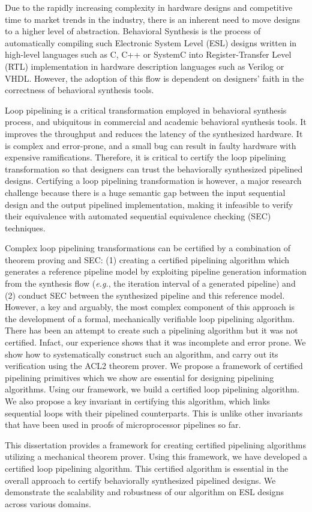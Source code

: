 Due to the rapidly increasing complexity in hardware designs and competitive time to market trends in the industry, there is an inherent need to move designs to a higher level of abstraction. Behavioral Synthesis is the process of automatically compiling such Electronic System Level (ESL) designs written in high-level languages such as C, C++ or SystemC into Register-Transfer Level (RTL) implementation in hardware description languages such as Verilog or VHDL. However, the adoption of this flow is dependent on designers' faith in the correctness of behavioral synthesis tools. 

Loop pipelining is a critical transformation employed in behavioral synthesis process, and ubiquitous in commercial and academic behavioral synthesis tools. It improves the throughput and reduces the latency of the synthesized hardware. It is complex and error-prone, and a small bug can result in faulty hardware with expensive ramifications. Therefore, it is critical to certify the loop pipelining transformation so that designers can trust the behaviorally synthesized pipelined designs.
Certifying a loop pipelining transformation is however, a major research challenge
because there is a huge semantic gap between the input sequential design and the output pipelined implementation, making it infeasible to verify their equivalence with automated sequential equivalence checking (SEC) techniques.

Complex loop pipelining transformations can be certified by a combination of theorem proving and SEC: (1) creating a certified pipelining algorithm which generates a reference pipeline model by exploiting pipeline generation information from the synthesis flow ({\em e.g.}, the iteration interval of a generated pipeline) and (2) conduct SEC between the synthesized pipeline and this reference model. However, a key and arguably, the most complex component of this approach is the development of a formal, mechanically verifiable loop pipelining algorithm. There has been an attempt to create such a pipelining algorithm but it was not certified. Infact, our experience shows that it was incomplete and error prone. We show how to systematically construct such an algorithm, and carry out its verification using the ACL2 theorem prover. We propose a framework of certified pipelining primitives which we show are essential for designing pipelining algorithms. Using our framework, we build a certified loop pipelining algorithm. We also propose a key invariant in certifying this algorithm, which links sequential loops with their pipelined counterparts. This is unlike other invariants that have been used in proofs of microprocessor pipelines so far.

This dissertation provides a framework for creating certified pipelining algorithms utilizing a mechanical theorem prover. Using this framework, we have developed a certified loop pipelining algorithm. This certified algorithm is essential in the overall approach to certify behaviorally synthesized pipelined designs. We demonstrate the scalability and robustness of our algorithm on ESL designs across various domains. 
